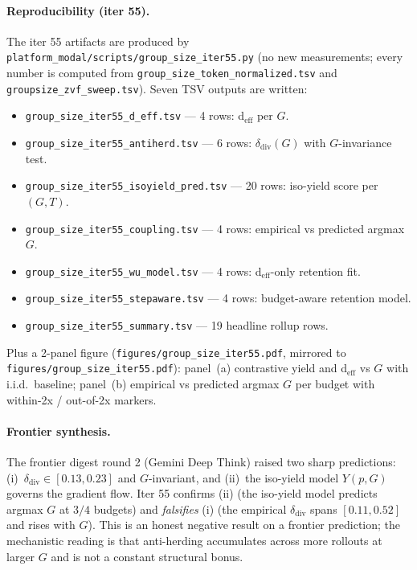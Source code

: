 \paragraph{Reproducibility (iter 55).}
The iter 55 artifacts are produced by
\texttt{platform\_modal/scripts/group\_size\_iter55.py} (no new measurements; every
number is computed from \texttt{group\_size\_token\_normalized.tsv}
and \texttt{groupsize\_zvf\_sweep.tsv}).  Seven TSV outputs are
written:
\begin{itemize}
  \item \texttt{group\_size\_iter55\_d\_eff.tsv} --- 4 rows: d$_{\mathrm{eff}}$ per $G$.
  \item \texttt{group\_size\_iter55\_antiherd.tsv} --- 6 rows: $\delta_{\mathrm{div}}(G)$ with $G$-invariance test.
  \item \texttt{group\_size\_iter55\_isoyield\_pred.tsv} --- 20 rows: iso-yield score per $(G, T)$.
  \item \texttt{group\_size\_iter55\_coupling.tsv} --- 4 rows: empirical vs predicted argmax $G$.
  \item \texttt{group\_size\_iter55\_wu\_model.tsv} --- 4 rows: d$_{\mathrm{eff}}$-only retention fit.
  \item \texttt{group\_size\_iter55\_stepaware.tsv} --- 4 rows: budget-aware retention model.
  \item \texttt{group\_size\_iter55\_summary.tsv} --- 19 headline rollup rows.
\end{itemize}
Plus a 2-panel figure (\texttt{figures/group\_size\_iter55.pdf},
mirrored to \texttt{figures/group\_size\_iter55.pdf}):
panel~(a) contrastive yield and d$_{\mathrm{eff}}$ vs $G$ with i.i.d.\
baseline; panel~(b) empirical vs predicted argmax $G$ per budget
with within-2x / out-of-2x markers.

\paragraph{Frontier synthesis.}
The frontier digest round 2 (Gemini Deep Think) raised two sharp
predictions: (i)~$\delta_{\mathrm{div}} \in [0.13, 0.23]$ and
$G$-invariant, and (ii)~the iso-yield model $Y(p, G)$ governs the
gradient flow.  Iter 55 confirms (ii) (the iso-yield model predicts
argmax $G$ at $3/4$ budgets) and \emph{falsifies} (i) (the empirical
$\delta_{\mathrm{div}}$ spans $[0.11, 0.52]$ and rises with $G$).
This is an honest negative result on a frontier prediction; the
mechanistic reading is that anti-herding accumulates across more
rollouts at larger $G$ and is not a constant structural bonus.
